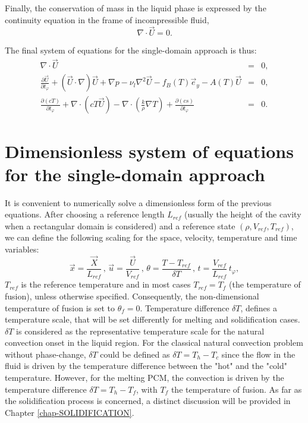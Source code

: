 Finally, the conservation of mass in the liquid phase is expressed by the continuity equation in the frame of incompressible fluid,
\begin{equation}\label{eq-mass-conserv}
\nabla \cdot \vec{U} = 0.
\end{equation} 

The final system of equations for the single-domain approach is thus:
\begin{eqnarray} 
	\nabla \cdot \vec{U} &=& 0, \\
	\frac{\partial \vec{U}}{\partial t_{\varphi}} +   {(\vec{U}\cdot\nabla ) \vec{U}} + \nabla p - \nu_{l}  {\nabla^2 \vec{U}} 
- f_B(T) \vec{e}_y - A(T) \vec{U} & = & 0, \\
	\frac{\partial \left(c T\right)}{\partial t_{\varphi}} + \nabla \cdot\left( c T \vec{U}\right) -
\nabla \cdot\left( \frac{k}{\rho} \nabla T \right) +  \frac{\partial \left(c s\right)}{\partial t_{\varphi}}  &=& 0.
\end{eqnarray}


\section{Dimensionless system of equations for the single-domain approach}\label{sec-eq-scaling}

It is convenient to numerically solve a dimensionless form of the previous equations.
After choosing a reference length $L_{ref}$ (usually the height of the cavity when a rectangular domain is considered) and a reference state $(\rho, V_{ref}, T_{ref})$, we can define the following scaling for the space, velocity, temperature and time variables:
\begin{equation}\label{eq-adim}
\vec{x} = \frac{\vec{X}}{L_{ref}} \, , \,  \vec{u} = \frac{\vec{U}}{V_{ref}} \, , \,  \theta = \frac{T-T_{ref}}{\delta T} \, , \,  t = \frac{V_{ref}}{L_{ref}} \, t_{\varphi},
\end{equation}
$T_{ref}$ is the reference temperature and in most cases $T_{ref} = T_f$ (the temperature of fusion), unless otherwise specified.
Consequently, the non-dimensional temperature of fusion is set to $\theta_f = 0$.
Temperature difference  $\delta T$, defines a temperature scale, that will be set differently for melting and solidification cases.
$\delta T$ is considered as the representative temperature scale  for the natural convection onset in the liquid region. 
For the classical natural convection problem without phase-change, $\delta T$ could be defined as $\delta T=T_{h}-T_{c}$ since the flow in the fluid is driven by the temperature difference between the "hot" and the "cold" temperature.
However, for the melting PCM, the convection is driven by the temperature difference $\delta T=T_{h}-T_{f}$, with $T_f$ the temperature of fusion.
As far as the solidification process is concerned, a distinct discussion will be provided in Chapter \ref{chap-SOLIDIFICATION}. %

